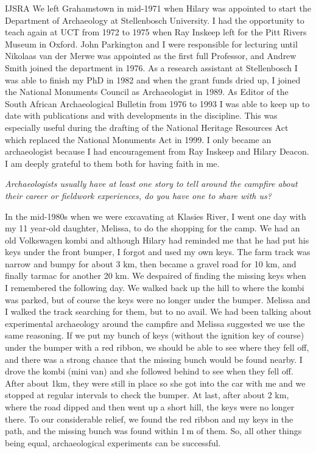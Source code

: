 \begin{labeling}{IJSRA}
We left Grahamstown in mid-1971 when Hilary was appointed to start the Department of Archaeology at Stellenbosch University. I had the opportunity to teach again at UCT from 1972 to 1975 when Ray Inskeep left for the Pitt Rivers Museum in Oxford. John Parkington and I were responsible for lecturing until Nikolaas van der Merwe was appointed as the first full Professor, and Andrew Smith joined the department in 1976. As a research assistant at Stellenbosch I was able to finish my PhD in 1982 and when the grant funds dried up, I joined the National Monuments Council as Archaeologist in 1989. As Editor of the South African Archaeological Bulletin from 1976 to 1993 I was able to keep up to date with publications and with developments in the discipline. This was especially useful during the drafting of the National Heritage Resources Act which replaced the National Monuments Act in 1999. I only became an archaeologist because I had encouragement from Ray Inskeep and Hilary Deacon. I am deeply grateful to them both for having faith in me.


\item[IJSRA] \emph{Archaeologists usually have at least one story to tell around the campfire about their career or fieldwork experiences, do you have one to share with us?}
	
\item[JD]
In the mid-1980s when we were excavating at Klasies River, I went one day with my 11 year-old daughter, Melissa, to do the shopping for the camp. We had an old Volkswagen kombi and although Hilary had reminded me that he had put his keys under the front bumper, I forgot and used my own keys. The farm track was narrow and bumpy for about 3 km, then became a gravel road for 10 km, and finally tarmac for another 20 km. We despaired of finding the missing keys when I remembered the following day. We walked back up the hill to where the kombi was parked, but of course the keys were no longer under the bumper. Melissa and I walked the track searching for them, but to no avail. We had been talking about experimental archaeology around the campfire and Melissa suggested we use the same reasoning. If we put my bunch of keys (without the ignition key of course) under the bumper with a red ribbon, we should be able to see where they fell off, and there was a strong chance that the missing bunch would be found nearby. I drove the kombi (mini van) and she followed behind to see when they fell off. After about 1km, they were still in place so she got into the car with me and we stopped at regular intervals to check the bumper. At last, after about 2 km, where the road dipped and then went up a short hill, the keys were no longer there. To our considerable relief, we found the red ribbon and my keys in the path, and the missing bunch was found within 1\,m of them. So, all other things being equal, archaeological experiments can be successful.




\end{labeling}
